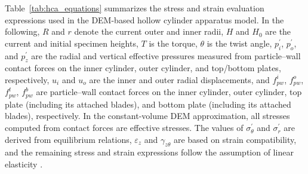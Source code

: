 \documentclass[a4paper,fleqn]{cas-sc}
\begin{document}
Table~\ref{tab:hca_equations} summarizes the stress and strain evaluation expressions used in the DEM-based hollow cylinder apparatus model. In the following, $R$ and $r$ denote the current outer and inner radii, $H$ and $H_0$ are the current and initial specimen heights, $T$ is the torque, $\theta$ is the twist angle, $p_i^{\prime}$, $p_o^{\prime}$, and $p_z^{\prime}$ are the radial and vertical effective pressures measured from particle--wall contact forces on the inner cylinder, outer cylinder, and top/bottom plates, respectively, $u_i$ and $u_o$ are the inner and outer radial displacements, and $f_{pw}^{i}$, $f_{pw}^{o}$, $f_{pw}^{t}$, $f_{pw}^{b}$ are particle--wall contact forces on the inner cylinder, outer cylinder, top plate (including its attached blades), and bottom plate (including its attached blades), respectively. In the constant-volume DEM approximation, all stresses computed from contact forces are effective stresses. The values of $\sigma_\theta^{\prime}$ and $\sigma_r^{\prime}$ are derived from equilibrium relations, $\varepsilon_z$ and $\gamma_{z\theta}$ are based on strain compatibility, and the remaining stress and strain expressions follow the assumption of linear elasticity \citep{Hight1983}.
\end{document}
